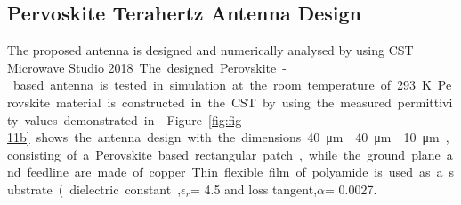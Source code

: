 \documentclass[12pt]{suhbook}
\begin{document}
\subsection{Pervoskite Terahertz Antenna Design}
The proposed antenna is designed and numerically analysed by using CST Microwave Studio \SI{2018}. The designed Perovskite-based antenna is tested in simulation at the room temperature of 293 K. Perovskite material is constructed in the CST by using the measured permittivity values demonstrated in \cite{green2014emergence}. Figure \ref{fig:fig 11b} shows the antenna design with the dimensions \SI{40}{\um} \times \SI{40}{\um} \times \SI{10}{\um} , consisting of a Perovskite based rectangular patch, while the ground plane and feedline are made of copper. Thin flexible film of polyamide is used as a substrate (dielectric constant,$ \epsilon_r $= 4.5 and loss tangent,$\alpha $= 0.0027.
\end{document}
